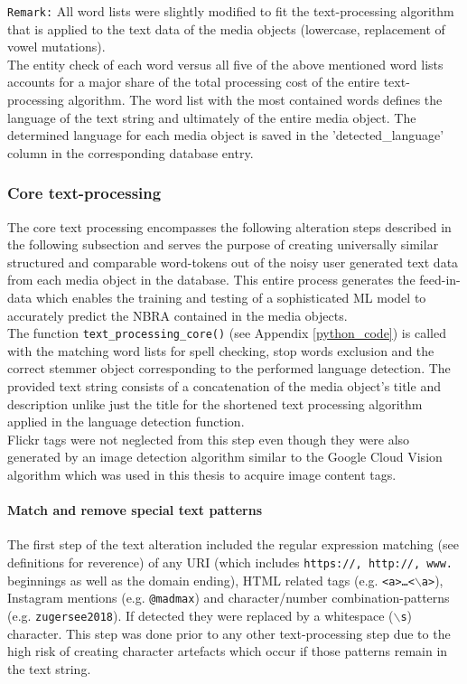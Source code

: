 \newline
\texttt{Remark:} All word lists were slightly modified to fit the text-processing algorithm that is applied to the text data of the media objects (lowercase, replacement of vowel mutations).\\
\newline
The entity check of each word versus all five of the above mentioned word lists accounts for a major share of the total processing cost of the entire text-processing algorithm. The word list with the most contained words defines the language of the text string and ultimately of the entire media object. The determined language for each media object is saved in the 'detected\_language' column in the corresponding database entry.\\


\subsubsection{Core text-processing} \label{core_text_processing}
The core text processing encompasses the following alteration steps described in the following subsection and serves the purpose of creating universally similar structured and comparable word-tokens out of the noisy user generated text data from each media object in the database. This entire process generates the feed-in-data which enables the training and testing of a sophisticated ML model to accurately predict the NBRA contained in the media objects.\\
The function \texttt{text\_processing\_core()} (see Appendix \ref{python_code}) is called with the matching word lists for spell checking, stop words exclusion and the correct stemmer object corresponding to the performed language detection. The provided text string consists of a concatenation of the media object's title and description unlike just the title for the shortened text processing algorithm applied in the language detection function.\\
Flickr tags were not neglected from this step even though they were also generated by an image detection algorithm similar to the Google Cloud Vision algorithm which was used in this thesis to acquire image content tags.

\paragraph*{Match and remove special text patterns} \label{text_patterns}
The first step of the text alteration included the regular expression matching (see definitions for reverence) of any URI (which includes \texttt{https://, http://, www.} beginnings as well as the domain ending), HTML related tags (e.g. \texttt{<a>\dots<$\backslash$a>}), Instagram mentions (e.g. \texttt{@madmax}) and character/number combination-patterns (e.g. \texttt{zugersee2018}). If detected they were replaced by a whitespace (\texttt{$\backslash$s}) character. This step was done prior to any other text-processing step due to the high risk of creating character artefacts which occur if those patterns remain in the text string.

